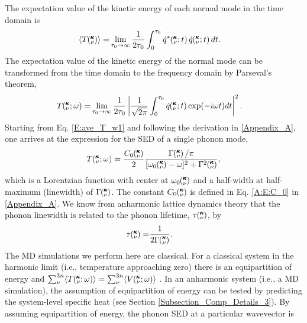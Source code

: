 \documentclass[12pt,twocolumn,iop]{/usr/share/texmf-texlive/tex/latex/iop/iopart}[/usr/share/texmf-texlive/tex/latex/iop/]
\newcommand{\kvt}{\mspace{-4.0mu}\left(\mspace{-8.0mu}\begin{smallmatrix}&\pmb{\kappa} \\&\nu\end{smallmatrix}\mspace{-2.0mu};t\right)}
\newcommand{\kvw}{\mspace{-4.0mu}\left(\mspace{-8.0mu}\begin{smallmatrix}&\pmb{\kappa} \\&\nu\end{smallmatrix}\mspace{-2.0mu};\omega\right)}
\newcommand{\kv}{\mspace{-4.0mu}\left(\mspace{-8.0mu}\begin{smallmatrix}&\pmb{\kappa} \\&\nu\end{smallmatrix}\mspace{-3.0mu}\right)}
\begin{document}
The expectation value of the kinetic energy of each normal mode in the time domain is
\begin{equation}\label{A:E:ave_T_t}
\begin{split}
\langle T\kv \rangle=&\lim_{\tau_0\rightarrow\infty}\frac{1}{2\tau_0}\int_{0}^{\tau_0}\dot{q}^*\kvt\dot{q}\kvt dt.
\end{split}
\end{equation}
The expectation value of the kinetic energy of the normal mode can be transformed from the time domain to the
frequency domain by Parseval's theorem,\cite{rudin1987}
\begin{equation}\label{E:ave_T_w1}
\begin{split}
T\kvw=&\lim_{\tau_0\rightarrow\infty}\frac{1}{2\tau_0}\left|\frac{1}{\sqrt{2\pi}}\int_{0}^{\tau_0}\dot{q}\kvt\exp(-i\omega t)dt\right|^2.
\end{split}
\end{equation}
Starting from Eq$.$ \eqref{E:ave_T_w1} and following the derivation in \ref{Appendix_A}, one arrives at the expression for the SED of a single phonon mode,
\begin{equation}\label{E:Lorentzian_NMD_2}
\begin{split}
T\kvw = \frac{C_0\kv}{2}\frac{\Gamma\kv/\pi}{[\omega_0\kv-\omega]^2+\Gamma^2\kv},
\end{split}
\end{equation}
which is a Lorentzian function with center at $\omega_0\kv$ and a half-width at half-maximum (linewidth) of
$\Gamma\kv$. The constant $C_0\kv$ is defined in Eq$.$ \eqref{A:E:C_0} in \ref{Appendix_A}. We know from anharmonic lattice dynamics theory that the phonon linewidth is related to the phonon lifetime, $\tau\kv$, by\cite{maradudin1962,ladd1986}
\begin{equation}\label{E:lifetime}
\begin{split}
\tau\kv=&\frac{1}{2\Gamma\kv}.
\end{split}
\end{equation}
The MD simulations we perform here are classical. For a classical system in the harmonic limit (i.e., temperature approaching zero) there is an equipartition of energy and $\sum_{\nu}^{3n} \langle T\kvw \rangle = \sum_{\nu}^{3n} \langle V\kvw \rangle$ \cite{mcquarrie2000}. In an anharmonic system (i.e., a MD simulation), the assumption of equipartition of energy can be tested by predicting the system-level specific heat (see Section \ref{Subsection_Comp_Details_3}). By assuming equipartition of energy, the phonon SED at a particular wavevector is
\end{document}

